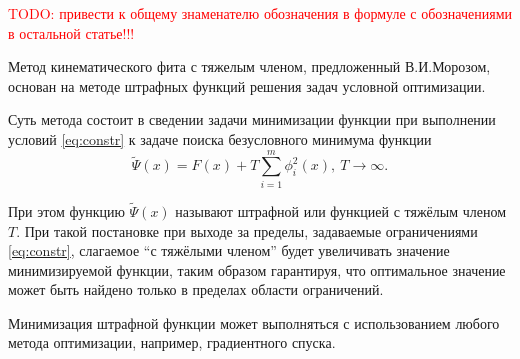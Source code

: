 
\textcolor{red}{TODO: привести к общему знаменателю обозначения в формуле с обозначениями в остальной статье!!!}

Метод кинематического фита с тяжелым членом, предложенный В.И.Морозом, основан на методе штрафных функций решения задач условной оптимизации.

Суть метода состоит в сведении задачи минимизации функции \label{track_fit} при выполнении условий \eqref{eq:constr} к задаче поиска безусловного минимума функции
\begin{equation}
 \tilde{\Psi}(x) = F(x) + T\sum_{i=1}^{m}\phi_i^2(x),~T \rightarrow \infty.
\end{equation}

При этом функцию $ \tilde{\Psi}(x)$ называют штрафной или функцией с тяжёлым членом $T$. При такой постановке при выходе за пределы, задаваемые ограничениями \eqref{eq:constr}, слагаемое ``с тяжёлыми членом'' будет увеличивать значение минимизируемой функции, таким образом гарантируя, что оптимальное значение может быть найдено только в пределах области ограничений.

Минимизация штрафной функции может выполняться с использованием любого метода оптимизации, например, градиентного спуска.
